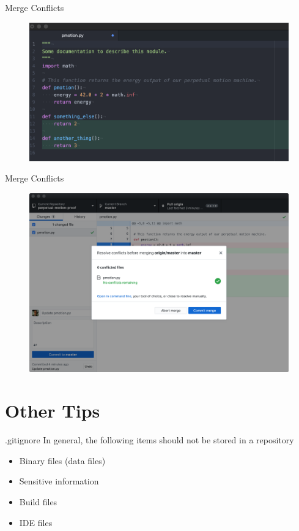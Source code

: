 \documentclass{beamer}
\begin{document}
    \begin{frame}{Merge Conflicts}
        \begin{figure}
            \centering
            \includegraphics[width=\textwidth]{figures/merge_4.png}
        \end{figure}
    \end{frame}

    \begin{frame}{Merge Conflicts}
        \begin{figure}
            \centering
            \includegraphics[width=\textwidth]{figures/merge_5.png}
        \end{figure}
    \end{frame}

    \section{Other Tips}\label{sec:other-tips}
    \begin{frame}{.gitignore}
        In general, the following items should not be stored in a repository
        \begin{itemize}
            \item Binary files (data files)
            \item Sensitive information
            \item Build files
            \item IDE files
        \end{itemize}
    \end{frame}
\end{document}
